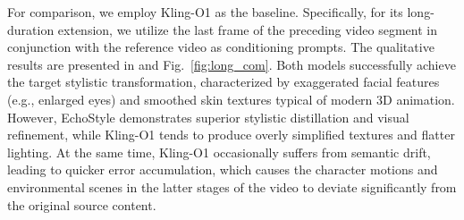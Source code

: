 \documentclass[runningheads]{llncs}
\begin{document}
For comparison, we employ Kling-O1 as the baseline. Specifically, for its long-duration extension, we utilize the last frame of the preceding video segment in conjunction with the reference video as conditioning prompts. The qualitative results are presented in and Fig.~\ref{fig:long_com}. Both models successfully achieve the target stylistic transformation, characterized by exaggerated facial features (e.g., enlarged eyes) and smoothed skin textures typical of modern 3D animation. However, EchoStyle demonstrates superior stylistic distillation and visual refinement, while Kling-O1 tends to produce overly simplified textures and flatter lighting. At the same time, Kling-O1 occasionally suffers from semantic drift, leading to quicker error accumulation, which causes the character motions and environmental scenes in the latter stages of the video to deviate significantly from the original source content.
\end{document}
